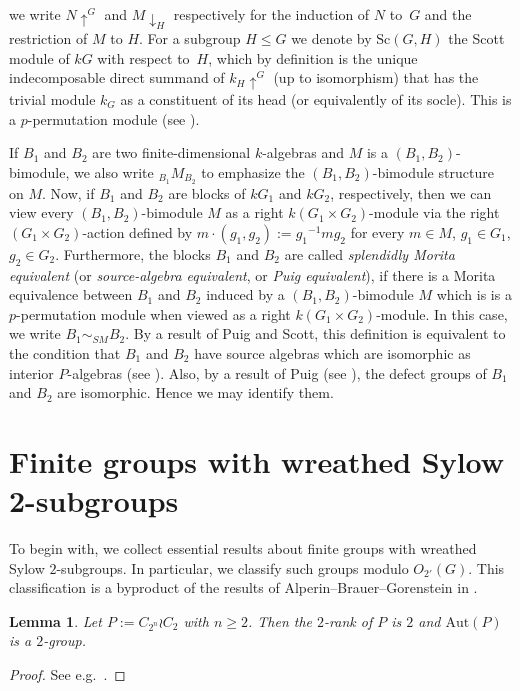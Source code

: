 \documentclass[12pt,a4paper]{amsart}
\theoremstyle{plain}\newtheorem{Theorem}{Theorem}[section]
\theoremstyle{plain}\newtheorem{Conjecture}[Theorem]{Conjecture}
\theoremstyle{plain}\newtheorem{Corollary}[Theorem]{Corollary}
\theoremstyle{plain}\newtheorem{Lemma}[Theorem]{Lemma}
\theoremstyle{plain}\newtheorem{Proposition}[Theorem]{Proposition}
\theoremstyle{definition}\newtheorem{Definition}[Theorem]{Definition}
\theoremstyle{definition}\newtheorem{Example}[Theorem]{Example}
\theoremstyle{definition}\newtheorem{Examples}[Theorem]{Examples}
\theoremstyle{definition}\newtheorem{Remark}[Theorem]{Remark}
\theoremstyle{definition}\newtheorem{Question}[Theorem]{Question}
\theoremstyle{definition}\newtheorem{Notation}[Theorem]{Notation}
\theoremstyle{definition}\newtheorem{Hypothesis}[Theorem]{Hypothesis}
\theoremstyle{definition}\newtheorem{Assumption}[Theorem]{Assumption}
\theoremstyle{definition}\newtheorem{Strategy}[Theorem]{Strategy}
\theoremstyle{definition}\newtheorem{Contents}[Theorem]{Contents}
\theoremstyle{definition}\newtheorem{Computations}[Theorem]{Computations}
\theoremstyle{definition}\newtheorem{Equivalences}[Theorem]{Equivalences}
\theoremstyle{definition}\newtheorem{Notation/Definition}[Theorem]{Notation/Definition}
\theoremstyle{definition}\newtheorem{noth}[Theorem]{}
\theoremstyle{plain}\newtheorem{Step}[Theorem]{Step}
\def\Aut{\mathrm{Aut}}
\begin{document}
we write $N{\uparrow}^G$ and $M{\downarrow}_H$ respectively for
the induction of $N$ to~$G$ and the restriction of $M$ to $H$.
For a subgroup $H\leq G$ 
we denote by ${\mathrm{Sc}}(G,H)$ the Scott module of $kG$ with 
respect to~$H$, which by 
definition is the unique indecomposable direct summand of 
${k_H}{\uparrow}^G$ (up to isomorphism) that has the trivial module $k_G$ as a constituent of its
head (or equivalently of its socle). This is a $p$-permutation module (see
\cite[Chapter 4, \S 8.4]{NT89}).
\par
If  $B_1$ and $B_2$ are two  finite-dimensional $k$-algebras and 
$M$ is a $(B_1,B_2)$-bimodule, we also 
write $_{B_1}\!M_{B_2}$ to emphasize the $(B_1,B_2)$-bimodule structure on $M$.
Now, if $B_1$ and $B_2$
are blocks of $kG_1$ and $kG_2$, respectively, then 
we can view every $(B_1,B_2)$-bimodule $M$ as a right $k(G_1\times G_2)$-module via the right 
$(G_1\times G_2)$-action defined 
by $m\cdot (g_1,g_2):={g_1}^{-1}mg_2$ for every $m\in M$, $g_1\in G_1$, $g_2\in G_2$. 
Furthermore, the blocks
$B_1$ and $B_2$ are called 
\emph{splendidly Morita equivalent} (or \emph{source-algebra equivalent}, or  
\emph{Puig equivalent}), if  
there is a Morita equivalence between $B_1$ and $B_2$ induced by a
$(B_1,B_2)$-bimodule $M$ which is 
is a $p$-permutation module when viewed as a right $k(G_1\times G_2)$-module. 
In this case, we write ${B_1}\sim_{SM}B_2$. 
By a result of Puig and Scott, this definition is equivalent to the condition that 
$B_1$ and $B_2$ have 
source algebras which are isomorphic as interior $P$-algebras 
(see \cite[Theorem~4.1]{Lin01}). Also, by a 
result of Puig (see \cite[Proposition~9.7.1]{Lin18}), the defect groups of 
$B_1$ and $B_2$ are isomorphic. 
Hence we may identify them. 


\section{Finite groups with wreathed Sylow 2-subgroups}\label{sec:wreathedSylow} 

To begin with, we collect essential results about  finite groups 
with wreathed Sylow $2$-subgroups. 
In particular, we classify such groups modulo $O_{2'}(G)$. This classification is a byproduct of the
results of Alperin--Brauer--Gorenstein in \cite{ABG70}. 

\begin{Lemma}\label{lem:CGp5956}
Let $P:=C_{2^n}\wr C_2$ with $n\geq 2$.  Then the $2$-rank of $P$ is $2$ 
and $\Aut(P)$ is a $2$-group.
\end{Lemma}
%
\begin{proof} 
See e.g.~\cite[p.\,5956]{CG12}.
\end{proof}
\end{document}
